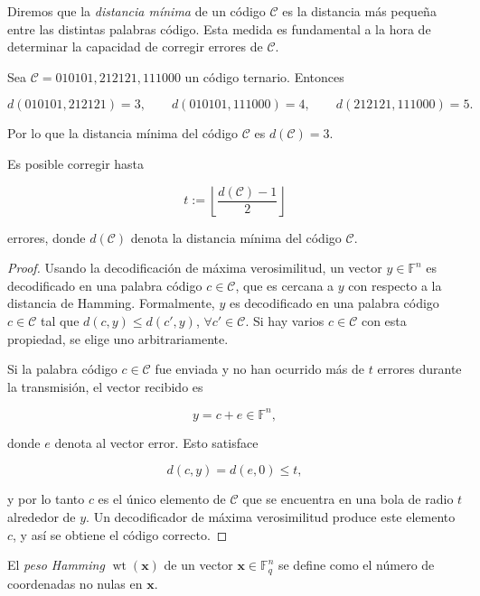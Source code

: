 Diremos que la \emph{distancia mínima} de un código $\mathcal{C}$ es la distancia más pequeña entre las distintas palabras código. Esta medida es fundamental a la hora de determinar la capacidad de corregir errores de $\mathcal{C}$.

\begin{exampleth}
    Sea $\mathcal{C} = {010101, 212121, 111000}$ un código ternario. Entonces

    $$d(010101, 212121) = 3, \qquad d(010101, 111000) = 4, \qquad d(212121, 111000) = 5.$$

    Por lo que la distancia mínima del código $\mathcal{C}$ es $d(\mathcal{C}) = 3$.
\end{exampleth}

\begin{theorem}
    \label{th:decodificacion_maxima_verosimilitud}
    Es posible corregir hasta

    $$t := \left\lfloor \frac{d(\mathcal{C}) - 1}{2} \right\rfloor$$

    errores, donde $d(\mathcal{C})$ denota la distancia mínima del código $\mathcal{C}$.
\end{theorem}

\begin{proof}
    Usando la decodificación de máxima verosimilitud, un vector $y \in \mathbb{F}^n$ es decodificado en una palabra código $c  \in \mathcal{C}$, que es cercana a $y$ con respecto a la distancia de Hamming. Formalmente, $y$ es decodificado en una palabra código $c \in \mathcal{C}$ tal que $d(c,y) \leq d(c',y)$, $\forall c' \in \mathcal{C}$. Si hay varios $c \in \mathcal{C}$ con esta propiedad, se elige uno arbitrariamente.

    Si la palabra código $c \in \mathcal{C}$ fue enviada y no han ocurrido más de $t$ errores durante la transmisión, el vector recibido es 

    $$y = c + e \in \mathbb{F}^n,$$

    donde $e$ denota al vector error. Esto satisface 

    $$d(c,y) = d(e,0) \leq t,$$

    y por lo tanto $c$ es el único elemento de $\mathcal{C}$ que se encuentra en una bola de radio $t$ alrededor de $y$. Un decodificador de máxima verosimilitud produce este elemento $c$, y así se obtiene el código correcto.
\end{proof}

\begin{definition}
    El \emph{peso Hamming} $\operatorname{wt}(\mathbf{x})$ de un vector $\mathbf{x} \in \mathbb{F}_q^n$ se define como el número de coordenadas no nulas en $\mathbf{x}$.
\end{definition}

